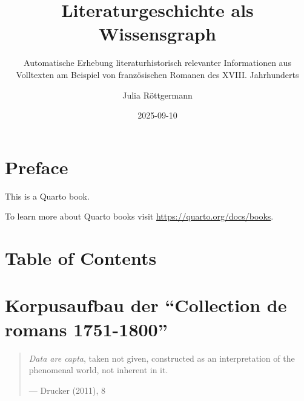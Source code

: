 \documentclass[
  12pt,
  letterpaper,
  DIV=11,
  numbers=noendperiod]{scrreprt}
\title{Literaturgeschichte als Wissensgraph}
\subtitle{Automatische Erhebung literaturhistorisch relevanter
Informationen aus Volltexten am Beispiel von französischen Romanen des
XVIII. Jahrhunderts}
\author{Julia Röttgermann}
\date{2025-09-10}
\renewcommand*\contentsname{Table of contents}
\newcommand\contentsname{Table of contents}
\begin{document}
\maketitle

\renewcommand*\contentsname{Table of contents}
{
\hypersetup{linkcolor=}
\setcounter{tocdepth}{2}
\tableofcontents
}


\chapter*{Preface}\label{preface}


This is a Quarto book.

To learn more about Quarto books visit
\url{https://quarto.org/docs/books}.


\chapter*{Table of Contents}\label{table-of-contents}



\chapter{Korpusaufbau der ``Collection de romans
1751-1800''}\label{korpusaufbau-der-collection-de-romans-1751-1800}

\begin{quote}
\emph{Data are capta}, taken not given, constructed as an interpretation
of the phenomenal world, not inherent in it.

--- Drucker (2011), 8
\end{quote}
\end{document}

